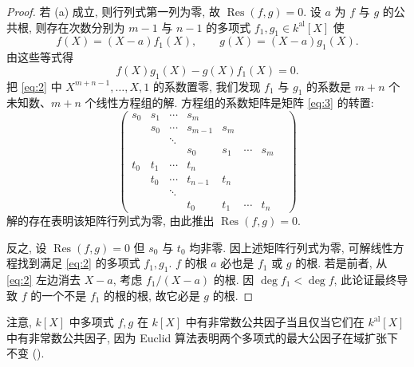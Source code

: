 \begin{proof}
若 (a) 成立, 则行列式第一列为零, 故 $\operatorname{Res}(f,g) = 0$. 设 $a$ 为 $f$ 与 $g$ 的公共根, 则存在次数分别为 $m-1$ 与 $n-1$ 的多项式 $f_1, g_1\in k^{\mathrm{al}}[X]$ 使
\[
f(X) = (X-a)f_1(X), \qquad g(X) = (X-a)g_1(X).
\]
由这些等式得
\begin{equation} \label{eq:2}
f(X)g_1(X) - g(X)f_1(X) = 0.
\tag{2}
\end{equation}
把 \eqref{eq:2} 中 $X^{m+n-1},\dots,X,1$ 的系数置零, 我们发现 $f_1$ 与 $g_1$ 的系数是 $m+n$ 个未知数、$m+n$ 个线性方程组的解. 方程组的系数矩阵是矩阵 \eqref{eq:3} 的转置:
\begin{equation} \label{eq:3}
\begin{pmatrix}
s_0 & s_1 & \cdots & s_m & & & & \\
& s_0 & \cdots & s_{m-1} & s_m & & & \\
& & \ddots & & & & & \\
& & & s_0 & s_1 & \cdots & s_m & \\
t_0 & t_1 & \cdots & t_n & & & & \\
& t_0 & \cdots & t_{n-1} & t_n & & & \\
& & \ddots & & & & & \\
& & & t_0 & t_1 & \cdots & t_n
\end{pmatrix}
\tag{3}
\end{equation}
解的存在表明该矩阵行列式为零, 由此推出 $\operatorname{Res}(f,g) = 0$.

反之, 设 $\operatorname{Res}(f,g) = 0$ 但 $s_0$ 与 $t_0$ 均非零. 因上述矩阵行列式为零, 可解线性方程找到满足 \eqref{eq:2} 的多项式 $f_1, g_1$. $f$ 的根 $a$ 必也是 $f_1$ 或 $g$ 的根. 若是前者, 从 \eqref{eq:2} 左边消去 $X-a$, 考虑 $f_1/(X-a)$ 的根. 因 $\deg f_1 < \deg f$, 此论证最终导致 $f$ 的一个不是 $f_1$ 的根的根, 故它必是 $g$ 的根.
\end{proof}

注意, $k[X]$ 中多项式 $f,g$ 在 $k[X]$ 中有非常数公共因子当且仅当它们在 $k^{\mathrm{al}}[X]$ 中有非常数公共因子, 因为 Euclid 算法表明两个多项式的最大公因子在域扩张下不变 (\cite[2.10]{milne-ft}).

